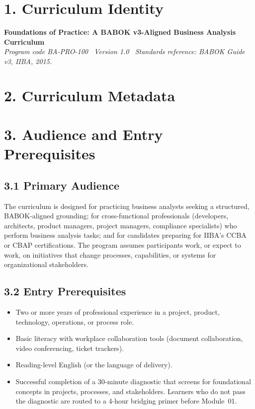\documentclass[11pt,letterpaper,oneside]{report}
\begin{document}
\makecurriculumtitle

\setcounter{page}{2}
\tableofcontents
\clearpage
{}
\setcounter{page}{1}


\section*{1. Curriculum Identity}
\textbf{\large Foundations of Practice: A BABOK v3-Aligned Business Analysis Curriculum} \\
\textit{Program code BA-PRO-100 \textbar\ Version 1.0 \textbar\ Standards reference: BABOK Guide v3, IIBA, 2015.}

\section*{2. Curriculum Metadata}
\CurriculumMetadataTable

\section*{3. Audience and Entry Prerequisites}

\subsection*{3.1 Primary Audience}
The curriculum is designed for practicing business analysts seeking a structured, BABOK-aligned grounding; for cross-functional professionals (developers, architects, product managers, project managers, compliance specialists) who perform business analysis tasks; and for candidates preparing for IIBA's CCBA or CBAP certifications. The program assumes participants work, or expect to work, on initiatives that change processes, capabilities, or systems for organizational stakeholders.

\subsection*{3.2 Entry Prerequisites}
\begin{itemize}
  \item Two or more years of professional experience in a project, product, technology, operations, or process role.
  \item Basic literacy with workplace collaboration tools (document collaboration, video conferencing, ticket trackers).
  \item Reading-level English (or the language of delivery).
  \item Successful completion of a 30-minute diagnostic that screens for foundational concepts in projects, processes, and stakeholders. Learners who do not pass the diagnostic are routed to a 4-hour bridging primer before Module~01.
\end{itemize}
\end{document}

